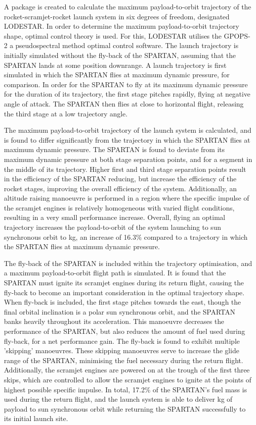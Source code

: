  A package is created to calculate the maximum payload-to-orbit trajectory of the rocket-scramjet-rocket launch system in six degrees of freedom, designated LODESTAR.
 In order to determine the maximum payload-to-orbit trajectory shape, optimal control theory is used. For this, LODESTAR utilises the GPOPS-2 a pseudospectral method optimal control software. 
 The launch trajectory is initially simulated without the fly-back of the SPARTAN, assuming that the SPARTAN lands at some position downrange. A launch trajectory is first simulated in which the SPARTAN flies at maximum dynamic pressure, for comparison. In order for the SPARTAN to fly at its maximum dynamic pressure for the duration of its trajectory, the first stage pitches rapidly, flying at negative angle of attack. The SPARTAN then flies at close to horizontal flight, releasing the third stage at a low trajectory angle. 
 
The maximum payload-to-orbit trajectory of the launch system is calculated, and is found to differ significantly from the trajectory in which the SPARTAN flies at maximum dynamic pressure. 
 The SPARTAN is found to deviate from its maximum dynamic pressure at both stage separation points, and for a segment in the middle of its trajectory.
 Higher first and third stage separation points result in the efficiency of the SPARTAN reducing, but increase the efficiency of the rocket stages, improving the overall efficiency of the system. 
  Additionally, an altitude raising manoeuvre is performed in a region where the specific impulse of the scramjet engines is relatively homogeneous with varied flight conditions, resulting in a very small performance increase. Overall, flying an optimal trajectory increases the payload-to-orbit of the system launching to sun synchronous orbit to \PayloadToOrbitStandardNoReturn kg, an increase of 16.3\% compared to a trajectory in which the SPARTAN flies at maximum dynamic pressure.  
 
 
 The fly-back of the SPARTAN is included within the trajectory optimisation, and a maximum payload-to-orbit flight path is simulated. 
 It is found that the SPARTAN must ignite its scramjet engines during its return flight, causing the fly-back to become an important consideration in the optimal trajectory shape. When fly-back is included, the first stage pitches towards the east, though the final orbital inclination is a polar sun synchronous orbit, and the SPARTAN banks heavily throughout its acceleration. This manoeuvre decreases the performance of the SPARTAN, but also reduces the amount of fuel used during fly-back, for a net performance gain. 
The fly-back is found to exhibit multiple 'skipping' manoeuvres. These skipping manoeuvres serve to increase the glide range of the SPARTAN, minimising the fuel necessary during the return flight. Additionally, the scramjet engines are powered on at the trough of the first three skips, which are controlled to allow the scramjet engines to ignite at the points of highest possible specific impulse. In total, 17.2\% of the SPARTAN's fuel mass is used during the return flight, and the launch system is able to deliver \PayloadToOrbitStandard kg of payload to sun synchronous orbit while returning the SPARTAN successfully to its initial launch site.

